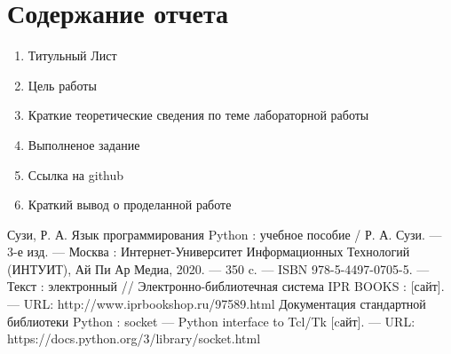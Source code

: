 \documentclass[a4paper]{article}
\begin{document}
\section{Содержание отчета}
\begin{enumerate}
  \item Титульный Лист
  \item Цель работы
  \item Краткие теоретические сведения по теме лабораторной работы
  \item Выполненое задание
  \item Ссылка на github
  \item Краткий вывод о проделанной работе
\end{enumerate}

\begin{thebibliography}{3}
  Сузи, Р. А. Язык программирования Python : учебное пособие / Р. А. Сузи. — 3-е изд. — Москва : Интернет-Университет Информационных Технологий (ИНТУИТ), Ай Пи Ар Медиа, 2020. — 350 c. — ISBN 978-5-4497-0705-5. — Текст : электронный // Электронно-библиотечная система IPR BOOKS : [сайт]. — URL: http://www.iprbookshop.ru/97589.html
   Документация стандартной библиотеки Python : socket — Python interface to Tcl/Tk [cайт]. --- URL: https://docs.python.org/3/library/socket.html
\end{thebibliography}
\end{document}
